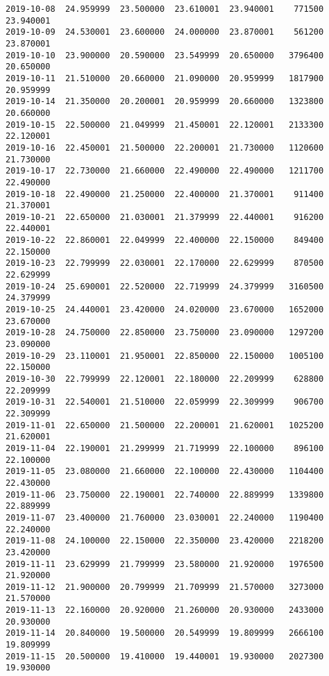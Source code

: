 \documentclass[11pt]{article}
\begin{document}
\begin{Verbatim}[commandchars=\\\{\}]
2019-10-08  24.959999  23.500000  23.610001  23.940001    771500  23.940001
2019-10-09  24.530001  23.600000  24.000000  23.870001    561200  23.870001
2019-10-10  23.900000  20.590000  23.549999  20.650000   3796400  20.650000
2019-10-11  21.510000  20.660000  21.090000  20.959999   1817900  20.959999
2019-10-14  21.350000  20.200001  20.959999  20.660000   1323800  20.660000
2019-10-15  22.500000  21.049999  21.450001  22.120001   2133300  22.120001
2019-10-16  22.450001  21.500000  22.200001  21.730000   1120600  21.730000
2019-10-17  22.730000  21.660000  22.490000  22.490000   1211700  22.490000
2019-10-18  22.490000  21.250000  22.400000  21.370001    911400  21.370001
2019-10-21  22.650000  21.030001  21.379999  22.440001    916200  22.440001
2019-10-22  22.860001  22.049999  22.400000  22.150000    849400  22.150000
2019-10-23  22.799999  22.030001  22.170000  22.629999    870500  22.629999
2019-10-24  25.690001  22.520000  22.719999  24.379999   3160500  24.379999
2019-10-25  24.440001  23.420000  24.020000  23.670000   1652000  23.670000
2019-10-28  24.750000  22.850000  23.750000  23.090000   1297200  23.090000
2019-10-29  23.110001  21.950001  22.850000  22.150000   1005100  22.150000
2019-10-30  22.799999  22.120001  22.180000  22.209999    628800  22.209999
2019-10-31  22.540001  21.510000  22.059999  22.309999    906700  22.309999
2019-11-01  22.650000  21.500000  22.200001  21.620001   1025200  21.620001
2019-11-04  22.190001  21.299999  21.719999  22.100000    896100  22.100000
2019-11-05  23.080000  21.660000  22.100000  22.430000   1104400  22.430000
2019-11-06  23.750000  22.190001  22.740000  22.889999   1339800  22.889999
2019-11-07  23.400000  21.760000  23.030001  22.240000   1190400  22.240000
2019-11-08  24.100000  22.150000  22.350000  23.420000   2218200  23.420000
2019-11-11  23.629999  21.799999  23.580000  21.920000   1976500  21.920000
2019-11-12  21.900000  20.799999  21.709999  21.570000   3273000  21.570000
2019-11-13  22.160000  20.920000  21.260000  20.930000   2433000  20.930000
2019-11-14  20.840000  19.500000  20.549999  19.809999   2666100  19.809999
2019-11-15  20.500000  19.410000  19.440001  19.930000   2027300  19.930000


\end{Verbatim}
\end{document}
